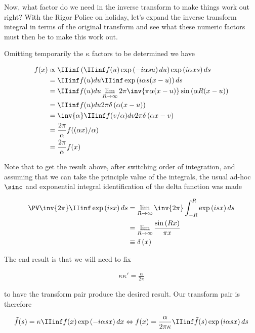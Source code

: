 Now, what factor do we need in the inverse transform to make things work out right?  With the Rigor
Police on holiday, let's expand the inverse transform integral in terms of the original transform
and see what these numeric factors must then be to make this work out.

Omitting temporarily the $\kappa$ factors to be determined we have 

\begin{align*}
f(x) 
&\propto \IIinf \left( \IIinf f(u) \exp\left( - i \alpha s u \right) du \right) \exp\left( i \alpha x s \right) ds \\
&= \IIinf f(u) du \IIinf \exp\left( i \alpha s (x-u) \right) ds \\
&= \IIinf f(u) du \lim_{R\rightarrow \infty} 2 \pi \inv{ \pi \alpha(x-u) }\sin\left( \alpha R (x-u) \right) \\
&= \IIinf f(u) du 2 \pi \delta\left( \alpha (x-u) \right) \\
&= \inv{\alpha} \IIinf f(v/\alpha) dv 2 \pi \delta\left( \alpha x - v \right) \\
&= \frac{2 \pi}{\alpha} f((\alpha x)/\alpha) \\
&= \frac{2 \pi}{\alpha} f(x)
\end{align*}

Note that to get the result above, after switching order of integration, and assuming that we can take the principle value of the integrals,
the usual ad-hoc $\sinc$ and exponential integral identification of the delta function was made

\begin{align*}
\PV \inv{2\pi} \IIinf \exp\left( i  s  x \right) ds 
&= \lim_{R \rightarrow \infty} \inv{2\pi} \int_{-R}^R \exp\left( i  s  x \right) ds \\
&= \lim_{R\rightarrow \infty} \frac{\sin\left(  R  x \right)}{ \pi  x } \\
&\equiv \delta\left( x \right) \\
\end{align*}

The end result is that we will need to fix

\begin{align*}
\kappa \kappa' = \frac{\alpha}{2\pi}
\end{align*}

to have the transform pair produce the desired result.  Our transform pair is therefore

\begin{align}\label{eqn:fourier_notation:blah}
\tilde{f}(s) = \kappa \IIinf f(x) \exp\left( - i \alpha s x \right) dx \Leftrightarrow f(x) = {\frac{ \alpha} {2 \pi \kappa} } \IIinf \tilde{f}(s) \exp\left( i \alpha s x \right) ds
\end{align}

